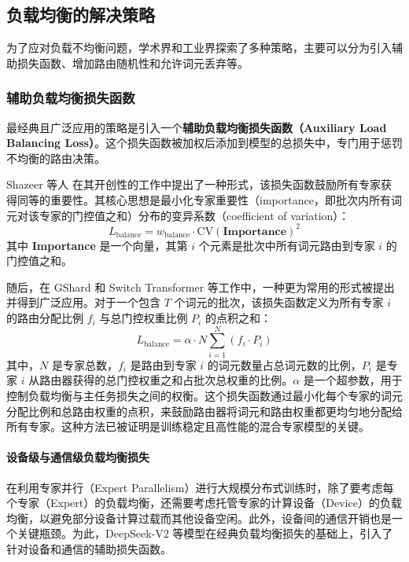 \subsection{负载均衡的解决策略}
为了应对负载不均衡问题，学术界和工业界探索了多种策略，主要可以分为引入辅助损失函数、增加路由随机性和允许词元丢弃等。

\subsubsection{辅助负载均衡损失函数}
\label{sec:aux_loss}
最经典且广泛应用的策略是引入一个\textbf{辅助负载均衡损失函数（Auxiliary Load Balancing Loss）}\cite{Shazeer2017OutrageouslyLN,Lepikhin2020GShardSG}。这个损失函数被加权后添加到模型的总损失中，专门用于惩罚不均衡的路由决策。

Shazeer 等人\cite{Shazeer2017OutrageouslyLN} 在其开创性的工作中提出了一种形式，该损失函数鼓励所有专家获得同等的重要性。其核心思想是最小化专家重要性（importance，即批次内所有词元对该专家的门控值之和）分布的变异系数（coefficient of variation）：
\begin{equation}
    L_{\text{balance}} = w_{\text{balance}} \cdot \text{CV}(\textbf{Importance})^2
\end{equation}
其中 \textbf{Importance} 是一个向量，其第 $i$ 个元素是批次中所有词元路由到专家 $i$ 的门控值之和。

随后，在 GShard\cite{Lepikhin2020GShardSG} 和 Switch Transformer\cite{Fedus2021SwitchTS} 等工作中，一种更为常用的形式被提出并得到广泛应用。对于一个包含 $T$ 个词元的批次，该损失函数定义为所有专家 $i$ 的路由分配比例 $f_i$ 与总门控权重比例 $P_i$ 的点积之和：
\begin{equation}
    L_{\text{balance}} = \alpha \cdot N \sum_{i=1}^{N} (f_i \cdot P_i)
\end{equation}
其中，$N$ 是专家总数，$f_i$ 是路由到专家 $i$ 的词元数量占总词元数的比例，$P_i$ 是专家 $i$ 从路由器获得的总门控权重之和占批次总权重的比例。$\alpha$ 是一个超参数，用于控制负载均衡与主任务损失之间的权衡。这个损失函数通过最小化每个专家的词元分配比例和总路由权重的点积，来鼓励路由器将词元和路由权重都更均匀地分配给所有专家。这种方法已被证明是训练稳定且高性能的混合专家模型的关键。

\paragraph{设备级与通信级负载均衡损失}
在利用专家并行（Expert Parallelism）进行大规模分布式训练时，除了要考虑每个专家（Expert）的负载均衡，还需要考虑托管专家的计算设备（Device）的负载均衡，以避免部分设备计算过载而其他设备空闲。此外，设备间的通信开销也是一个关键瓶颈。为此，DeepSeek-V2 \cite{DBLP:journals/corr/abs-2405-04434} 等模型在经典负载均衡损失的基础上，引入了针对设备和通信的辅助损失函数。

